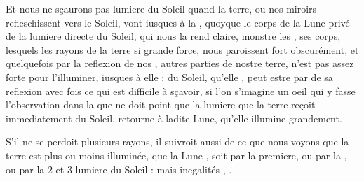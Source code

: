 \documentclass[11pt,a4paper]{article}
\begin{document}
Et nous ne sçaurons pas  \struck{\ill{}} lumiere du Soleil quand la terre, ou nos miroirs refleschissent vers le Soleil, vont iusques à la , quoyque le corps de la Lune privé de la \struck{\ill{}} lumiere directe du Soleil, qui nous la rend claire, monstre \struck{\ill{} \ill{} \ill{}} les  , \ill{} \ill{} \ill{} \ill{} \ill{} \ill{} \ill{} \ill{} \ill{} ses corps, \ill{} lesquels les rayons de la terre \ill{} \ill{} \ill{}  si grande force, \struck{\ill{}}  nous paroissent fort \struck{\ill{}} obscurément, et quelquefois \ill{} par  \ill{} \ill{} \struck{\ill{}}  la reflexion de nos ,  autres parties de nostre terre, \struck{\ill{}} n'est pas assez forte pour l'illuminer,  \ill{} \ill{} \ill{} \ill{} \ill{} \ill{} \ill{} \ill{} \ill{} \ill{} \ill{} \ill{} \ill{}  iusques à elle : \struck{\ill{}} du Soleil, qu'elle \struck{\ill{}} \ill{} \ill{}, \struck{\ill{}} peut estre par  de sa reflexion avec  fois \ill{} \struck{\ill{}} ce qui est difficile à sçavoir, \struck{\ill{}} si l'on s'imagine un oeil qui y fasse l'observation dans  la \ill{} \ill{} \ill{} \ill{} \struck{\ill{}} \ill{} \ill{} \ill{} que \struck{\ill{}} \ill{} \ill{} ne doit point que la lumiere que la terre reçoit immediatement du Soleil, \ill{} retourne à ladite Lune, qu'elle illumine grandement.

S'il ne se perdoit plusieurs rayons, il suivroit aussi de ce que nous voyons que la terre est plus ou moins illuminée, que la Lune \ill{}, soit par la premiere, ou par la  \ill{} \ill{}, ou par la 2 et 3 lumiere du Soleil : mais \struck{\ill{}} \add{\ill{}} inegalités \ill{} \ill{} \ill{} \ill{} \ill{} \ill{} \ill{}, .
\end{document}

